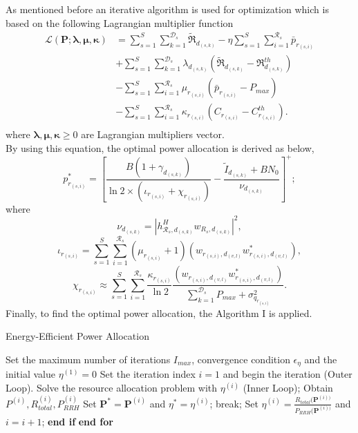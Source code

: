\documentclass[journal,onecolumn,11pt,draftcls,doublespace]{IEEEtran}
\begin{document}
As mentioned before an iterative algorithm is used for optimization which is based on the following Lagrangian multiplier function
\begin{equation}
\begin{split}
\mathcal{L}(\boldsymbol{P}; \boldsymbol{\lambda}, \boldsymbol{\mu}, \boldsymbol{ \kappa}) & = \sum\limits_{s=1}^{S} \sum\limits_{k=1}^{\mathcal{D}_s}\mathfrak{\tilde{R}}_{d_{(s,k)}} 
- \eta \sum\limits_{s=1}^{S} \sum\limits_{i=1}^{\mathcal{R}_s}\bar{p}_{r_{(s,i)}}\\
&+\sum\limits_{s=1}^{S} \sum\limits_{k=1}^{\mathcal{D}_s} \lambda_{d_{(s,k)}} (\mathfrak{\tilde{R}}_{d_{(s,k)}}-\mathfrak{R}_{d_{(s,k)}}^{th})\\
&- \sum\limits_{s=1}^{S} \sum\limits_{i=1}^{\mathcal{R}_s} \mu_{r_{(s,i)}} (\bar{p}_{r_{(s,i)}}-P_{max})\\
&- \sum\limits_{s=1}^{S} \sum\limits_{i=1}^{\mathcal{R}_s} \kappa_{r_{(s,i)}} (C_{r_{(s,i)}}-C_{r_{(s,i)}}^{th}).\\
\end{split}
\end{equation}
where $\boldsymbol{\lambda}, \boldsymbol{\mu}, \boldsymbol{\kappa} \geq 0$ are Lagrangian multipliers vector.\\
By using this equation, the optimal power allocation is derived as below,
\begin{equation}
p_{r_{(s,i)}}^* =[\frac{ B(1+\gamma_{d_{(s,k)}} )}{\ln2 \times (\iota_{r_{(s,i)}}+ \chi_{r_{(s,i)}})} -\frac{\tilde{I}_{d_{(s,k)}} + BN_0}{\nu_{d_{(s,k)}} }]^+;
\end{equation} 
where $$\nu_{d_{(s,k)}} =|h_{\mathcal{R}_s, d_{(s,k)}}^H w_{R_{s},d_{(s,k)}}|^2,$$
 $$\iota_{r_{(s,i)}}=\sum\limits_{s=1}^{S} \sum\limits_{i=1}^{\mathcal{R}_s} (\mu_{r_{(s,i)}}+1)(w_{r_{(s,i)},d_{(v,l)}} w_{r_{(s,i)},d_{(v,l)}}^*),$$
 $$\chi_{r_{(s,i)}} \approx  \sum\limits_{s=1}^{S} \sum\limits_{i=1}^{\mathcal{R}_s} \frac{\kappa_{r_{(s,i)}}}{\ln 2}\frac{(w_{r_{(s,i)},d_{(v,l)}} w_{r_{(s,i)},d_{(v,l)}}^*)}{ \sum\limits_{k=1}^{\mathcal{D}_s}P_{max}+\sigma_{q_{r_{(s,i)}}}^2}.$$
  Finally, to find the optimal power allocation, the Algorithm I is applied. 
\begin{algorithm}
\caption{Energy-Efficient Power Allocation}\label{alg}
\begin{algorithmic}[1]
\State Set the maximum number of iterations $I_{max}$, convergence condition $\epsilon_{\eta}$  and the initial value $\eta^{(1)} = 0$
\State Set the iteration index $i = 1$ and begin the iteration (Outer
Loop).
\State Solve the resource allocation problem with $\eta^{(i)}$ (Inner Loop);
\State Obtain $P^{(i)}, R_{total}^{(i)}, P_{RRH}^{(i)}$
\State Set $\boldsymbol{P}^*= \boldsymbol{P}^{(i)} $   and  $ \eta^{*} =\eta^{(i)} $;
\State break;
\Else
\State Set $\eta^{(i)}= \frac{R_{total}(\boldsymbol{P}^{(i))}}{P_{RRH}(\boldsymbol{P}^{(i))}}$ and $i= i+1$;
\EndIf 
\State \textbf{end if}
\EndFor 
\State \textbf{end for}
\end{algorithmic}
\end{algorithm}
\end{document}
